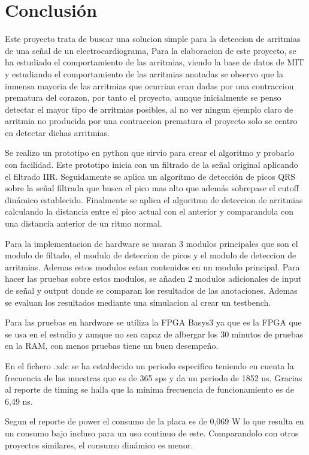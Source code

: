 \chapter*{Conclusión}
Este proyecto trata de buscar una solucion simple para la deteccion de 
arritmias de una señal de un electrocardiograma, Para la elaboracion de este proyecto, 
se ha estudiado el comportamiento de las arritmias, viendo la base de datos de MIT y estudiando
el comportamiento de las arritmias anotadas se observo que la inmensa mayoria de las arritmias 
que ocurrian eran dadas por una contraccion prematura del corazon, por tanto el proyecto, aunque
inicialmente se penso detectar el mayor tipo de arritmias posibles, al no ver ningun ejemplo claro
de arritmia no producida por una contraccion prematura el proyecto solo se centro en detectar dichas arritmias.

Se realizo un prototipo en python que sirvio para crear el algoritmo y probarlo con facilidad. Este prototipo inicia
con un filtrado de la señal original aplicando el filtrado IIR. Seguidamente se aplica un algoritmo de detección de 
picos QRS sobre la señal filtrada que busca el pico mas alto que además sobrepase el cutoff dinámico establecido. Finalmente
se aplica el algoritmo de deteccion de arritmias calculando la distancia entre el pico actual con el anterior y comparandola con una
distancia anterior de un ritmo normal.

Para la implementacion de hardware se usaran 3 modulos principales que son el modulo de filtado, el modulo de deteccion de picos 
y el modulo de deteccion de arritmias. Ademas estos modulos estan contenidos en un modulo principal. Para hacer las pruebas sobre
estos modulos, se añaden 2 modulos adicionales de input de señal y output donde se comparan los resultados de las anotaciones. Ademas 
se evaluan los resultados mediante una simulacion al crear un testbench.

Para las pruebas en hardware se utiliza la FPGA Basys3 ya que es la FPGA que se usa en el estudio y aunque no sea capaz de 
albergar los 30 minutos de pruebas en la RAM, con menos pruebas tiene un buen desempeño.

En el fichero .xdc se ha establecido un periodo especifico teniendo en cuenta la frecuencia de las muestras que es de 365 sps y da un periodo 
de 1852 ns. Gracias al reporte de timing se halla que la minima frecuencia de funcionamiento es de 6,49 ns.

Segun el reporte de power el consumo de la placa es de 0,069 W lo que resulta en un consumo bajo incluso para un uso continuo de este.
Comparandolo con otros proyectos similares, el consumo dinámico es menor.

